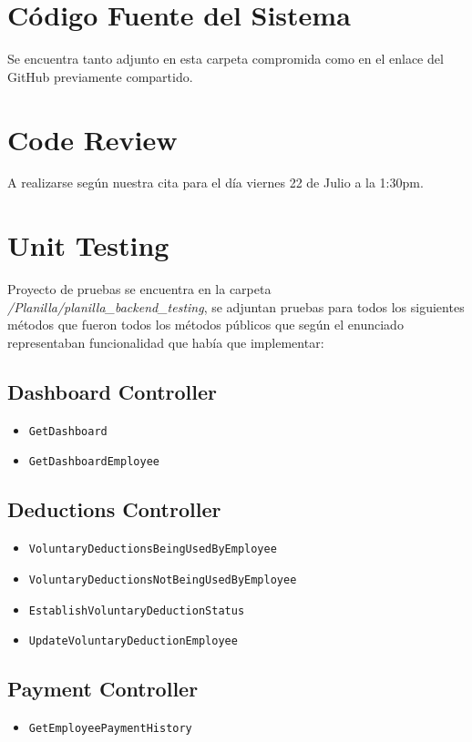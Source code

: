 \documentclass{article}
\begin{document}
\newpage
%

\section{Código Fuente del Sistema}
Se encuentra tanto adjunto en esta carpeta compromida como en el enlace del GitHub
previamente compartido.

\section{Code Review}
A realizarse según nuestra cita para el día viernes 22 de Julio a la 1:30pm.

\section{Unit Testing}
Proyecto de pruebas se encuentra en la carpeta \textit{/Planilla/planilla\_backend\_testing}, 
se adjuntan pruebas para todos los siguientes métodos que fueron todos los métodos públicos
que según el enunciado representaban funcionalidad que había que implementar:

\subsection{Dashboard Controller}
\begin{itemize}
  \item \texttt{GetDashboard}
  \item \texttt{GetDashboardEmployee}
\end{itemize}

\subsection{Deductions Controller}
\begin{itemize}
  \item \texttt{VoluntaryDeductionsBeingUsedByEmployee}
  \item \texttt{VoluntaryDeductionsNotBeingUsedByEmployee}
  \item \texttt{EstablishVoluntaryDeductionStatus}
  \item \texttt{UpdateVoluntaryDeductionEmployee}
\end{itemize}

\subsection{Payment Controller}
\begin{itemize}
  \item \texttt{GetEmployeePaymentHistory}
\end{itemize}
\end{document}
